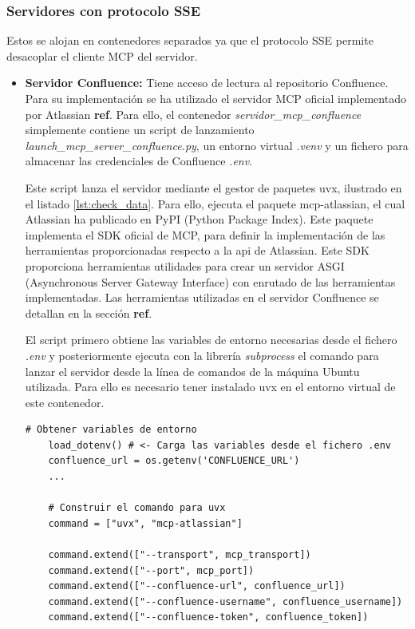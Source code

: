 \subsubsection{Servidores con protocolo SSE}
Estos se alojan en contenedores separados ya que el protocolo SSE permite desacoplar el cliente MCP del servidor.
\begin{itemize}
  \item\textbf{Servidor Confluence: }Tiene acceso de lectura al repositorio Confluence. Para su implementación se ha utilizado el servidor MCP oficial implementado por Atlassian \textbf{ref}. Para ello, el contenedor \textit{servidor\_mcp\_confluence} simplemente contiene un script de lanzamiento \textit{launch\_mcp\_server\_confluence.py}, un entorno virtual \textit{.venv} y un fichero para almacenar las credenciales de Confluence \textit{.env}. 

    Este script lanza el servidor mediante el gestor de paquetes uvx, ilustrado en el listado \ref{lst:check_data}. Para ello, ejecuta el paquete mcp-atlassian, el cual Atlassian ha publicado en PyPI (Python Package Index). Este paquete implementa el SDK oficial de MCP, para definir la implementación de las herramientas proporcionadas respecto a la api de Atlassian. Este SDK proporciona herramientas utilidades para crear un servidor ASGI (Asynchronous Server Gateway Interface) con enrutado de las herramientas implementadas. Las herramientas utilizadas en el servidor Confluence se detallan en la sección \textbf{ref}.  

El script primero obtiene las variables de entorno necesarias desde el fichero \textit{.env} y posteriormente ejecuta con la librería \textit{subprocess} el comando para lanzar el servidor desde la línea de comandos de la máquina Ubuntu utilizada. Para ello es necesario tener instalado uvx en el entorno virtual de este contenedor.
\begin{lstlisting}[caption={Ejecución del lanzamiento de servidor MCP Confluence con uvx},label={lst:check_data}]
    # Obtener variables de entorno
    load_dotenv() # <- Carga las variables desde el fichero .env
    confluence_url = os.getenv('CONFLUENCE_URL')
    ...

    # Construir el comando para uvx
    command = ["uvx", "mcp-atlassian"]
    
    command.extend(["--transport", mcp_transport])
    command.extend(["--port", mcp_port]) 
    command.extend(["--confluence-url", confluence_url])
    command.extend(["--confluence-username", confluence_username])
    command.extend(["--confluence-token", confluence_token])


\end{lstlisting}
\end{itemize}
